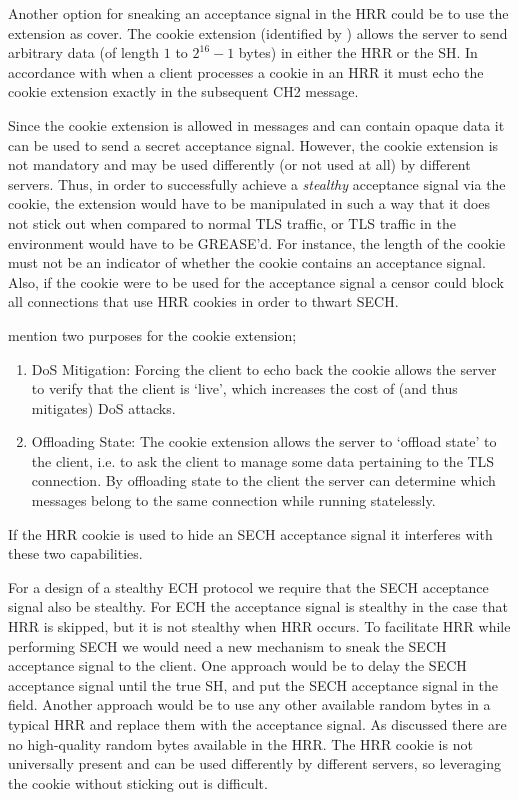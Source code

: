 Another option for sneaking an acceptance signal in the \ac{HRR}
could be to use the  extension as cover.
The cookie extension (identified by )
allows the server to send arbitrary data
(of length $1$ to $2^{16}-1$ bytes) in either the \ac{HRR} or the \ac{SH}.
In accordance with \cite{rfc8446} when a client processes a cookie in an \ac{HRR}
it must echo the cookie extension exactly in the subsequent \ac{CH2} message.

Since the cookie extension is allowed in  messages and can contain opaque data it can be used to send a secret acceptance signal.
However, the cookie extension is not mandatory and may be used differently
(or not used at all) by different servers.
Thus, in order to successfully achieve a {\em stealthy} acceptance signal via the cookie, the extension would have to be manipulated in such a way that it does not stick out  when compared to normal \ac{TLS} traffic,
or \ac{TLS} traffic in the environment would have to be \ac{GREASE}'d.
For instance, the length of the cookie must not be an indicator of whether the cookie contains an acceptance signal.
Also, if the cookie were to be used for the acceptance signal a censor could block all connections that use \ac{HRR} cookies in order to thwart \ac{SECH}.

\cite{rfc8446} mention two purposes for the cookie extension;
\begin{enumerate}
    \item \ac{DoS} Mitigation: Forcing the client to echo back the cookie allows the server to verify that the client is `live', which increases the cost of (and thus mitigates) \ac{DoS} attacks.
    \item Offloading State: The cookie extension allows the server to `offload state' to the client, i.e. to ask the client to manage some data pertaining to the \ac{TLS} connection. By offloading state to the client the server can determine which messages belong to the same connection while running statelessly.
\end{enumerate}
If the \ac{HRR} cookie is used to hide an \ac{SECH} acceptance signal it interferes with these two capabilities.


For a design of a stealthy \ac{ECH} protocol we require that the \ac{SECH} acceptance signal also be stealthy.
For \ac{ECH} the acceptance signal is stealthy in the case that \ac{HRR} is skipped, but it is not stealthy when \ac{HRR} occurs.
To facilitate \ac{HRR} while performing \ac{SECH}
we would need a new mechanism to sneak the \ac{SECH} acceptance signal to the client.
One approach would be to delay the SECH acceptance signal until the true \ac{SH},
and put the \ac{SECH} acceptance signal
in the  field.
Another approach would be to use any other available random bytes in a typical \ac{HRR} and replace them with the acceptance signal.
As discussed there are no high-quality random bytes available
in the \ac{HRR}.
The \ac{HRR} cookie is not universally
present and can be used differently by different servers,
so leveraging the cookie without sticking out is difficult.

